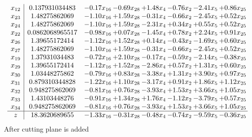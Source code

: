 \documentclass[8pt]{article}
\begin{document}
\[\begin{array}{c| c c@{\hskip 2pt} c@{\hskip 2pt} c@{\hskip 2pt} c@{\hskip 2pt} c@{\hskip 2pt} c@{\hskip 2pt} }
 x_{12}   &  0.137931034483 & -0.17 x_{16} & -0.69 x_{28} & +  1.48 x_{4} & -0.76 x_{2} & -2.41 x_{5} & +  0.86 x_{25}\\
 x_{23}   &  1.48275862069 & -1.10 x_{16} & +  1.59 x_{28} & -0.31 x_{4} & -0.66 x_{2} & -2.45 x_{5} & +  0.52 x_{25}\\
 x_{24}   &  1.48275862069 & -1.10 x_{16} & +  1.59 x_{28} & -2.31 x_{4} & +  0.34 x_{2} & +  0.55 x_{5} & +  0.52 x_{25}\\
 x_{22}   &  0.0862068965517 & -0.98 x_{16} & +  0.07 x_{28} & -1.45 x_{4} & +  0.78 x_{2} & +  2.24 x_{5} & +  0.91 x_{25}\\
 x_{26}   &  1.39655172414 & -1.12 x_{16} & +  1.52 x_{28} & +  0.14 x_{4} & -0.43 x_{2} & -1.69 x_{5} & +  0.60 x_{25}\\
 x_{27}   &  1.48275862069 & -1.10 x_{16} & +  1.59 x_{28} & -0.31 x_{4} & -0.66 x_{2} & -2.45 x_{5} & +  0.52 x_{25}\\
 x_{19}   &  1.37931034483 & -0.72 x_{16} & +  2.10 x_{28} & -0.17 x_{4} & -0.59 x_{2} & -2.14 x_{5} & -0.38 x_{25}\\
 x_{29}   &  1.39655172414 & -1.12 x_{16} & +  1.52 x_{28} & -2.86 x_{4} & +  0.57 x_{2} & +  1.31 x_{5} & +  0.60 x_{25}\\
 x_{30}   &  1.03448275862 & -0.79 x_{16} & +  0.83 x_{28} & -3.38 x_{4} & +  1.31 x_{2} & +  3.90 x_{5} & +  0.97 x_{25}\\
 x_{31}   &  0.879310344828 & -1.22 x_{16} & +  1.10 x_{28} & -3.17 x_{4} & +  0.91 x_{2} & +  1.86 x_{5} & +  1.12 x_{25}\\
 x_{32}   &  0.948275862069 & -0.81 x_{16} & +  0.76 x_{28} & -3.93 x_{4} & +  1.53 x_{2} & +  3.66 x_{5} & +  1.05 x_{25}\\
 x_{33}   &  1.43103448276 & -0.91 x_{16} & +  1.34 x_{28} & +  1.76 x_{4} & -1.12 x_{2} & -3.79 x_{5} & +  0.57 x_{25}\\
 x_{34}   &  0.948275862069 & -0.81 x_{16} & +  0.76 x_{28} & -3.93 x_{4} & +  1.53 x_{2} & +  3.66 x_{5} & +  1.05 x_{25}\\
\hline
z    &  18.3620689655 & -1.33 x_{16} & -0.31 x_{28} & -0.48 x_{4} & -0.74 x_{2} & -9.59 x_{5} & -0.36 x_{25}\\
\end{array}\]
 After cutting plane is added 
\end{document}
